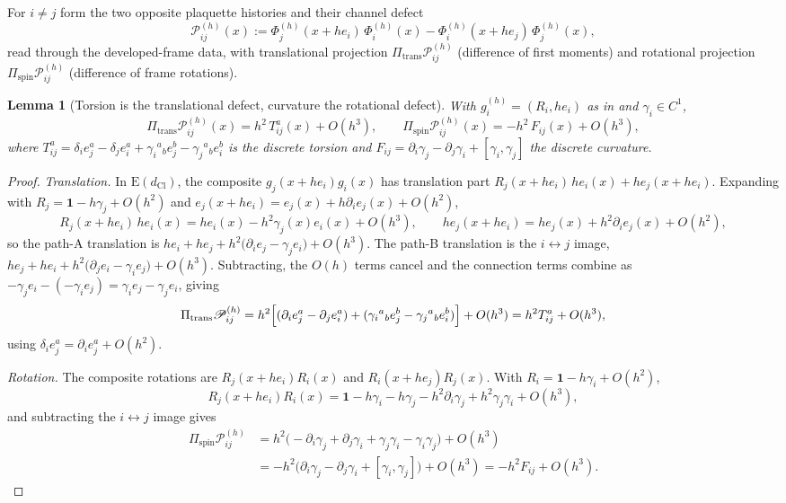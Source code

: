 \documentclass[11pt]{article}
\newtheorem{lemma}[theorem]{Lemma}
\theoremstyle{definition}
\theoremstyle{remark}
\newcommand{\dCl}{d_{\mathrm{Cl}}}
\newcommand{\one}{\mathbf{1}}
\newcommand{\Pitr}{\Pi_{\mathrm{trans}}}
\newcommand{\Pisp}{\Pi_{\mathrm{spin}}}
\newcommand{\Pcal}{\mathscr{P}}
\newcommand{\Fcal}{F}
\newcommand{\Eucl}{\mathrm{E}(\dCl)}
\begin{document}
For $i\neq j$ form the two opposite plaquette histories and their channel defect
\[
  \Pcal_{ij}^{(h)}(x)
  :=\Phi_j^{(h)}(x+he_i)\,\Phi_i^{(h)}(x)
   -\Phi_i^{(h)}(x+he_j)\,\Phi_j^{(h)}(x),
\]
read through the developed-frame data, with translational projection
$\Pitr\Pcal_{ij}^{(h)}$ (difference of first moments) and rotational projection
$\Pisp\Pcal_{ij}^{(h)}$ (difference of frame rotations).

\begin{lemma}[Torsion is the translational defect, curvature the rotational defect]
\label{lem:plaquette-split}
With $g_i^{(h)}=(R_i,he_i)$ as in  and
$\gamma_i\in C^1$,
\[
  \boxed{\ \Pitr\Pcal_{ij}^{(h)}(x)=h^2\,T^a_{ij}(x)+O(h^3),\qquad
  \Pisp\Pcal_{ij}^{(h)}(x)=-h^2\,\Fcal_{ij}(x)+O(h^3),\ }
\]
where $T^a_{ij}=\delta_i e^a_j-\delta_j e^a_i+\gamma_i{}^a{}_b e^b_j
-\gamma_j{}^a{}_b e^b_i$ is the discrete torsion and
$\Fcal_{ij}=\partial_i\gamma_j-\partial_j\gamma_i+[\gamma_i,\gamma_j]$ the
discrete curvature.
\end{lemma}

\begin{proof}
\emph{Translation.}  In $\Eucl$, the composite $g_j(x+he_i)g_i(x)$ has translation
part $R_j(x+he_i)\,h e_i(x)+h e_j(x+he_i)$.  Expanding with
$R_j=\one-h\gamma_j+O(h^2)$ and $e_j(x+he_i)=e_j(x)+h\partial_i e_j(x)+O(h^2)$,
\[
  R_j(x+he_i)\,h e_i(x)=h e_i(x)-h^2\gamma_j(x)e_i(x)+O(h^3),
  \qquad
  h e_j(x+he_i)=h e_j(x)+h^2\partial_i e_j(x)+O(h^2),
\]
so the path-A translation is
$h e_i+h e_j+h^2\bigl(\partial_i e_j-\gamma_j e_i\bigr)+O(h^3)$.  The path-B
translation is the $i\leftrightarrow j$ image,
$h e_j+h e_i+h^2\bigl(\partial_j e_i-\gamma_i e_j\bigr)+O(h^3)$.  Subtracting, the
$O(h)$ terms cancel and the connection terms combine as
$-\gamma_j e_i-(-\gamma_i e_j)=\gamma_i e_j-\gamma_j e_i$, giving
\[
  \Pitr\Pcal^{(h)}_{ij}
  =h^2\Bigl[(\partial_i e^a_j-\partial_j e^a_i)
   +(\gamma_i{}^a{}_b e^b_j-\gamma_j{}^a{}_b e^b_i)\Bigr]+O(h^3)
  =h^2 T^a_{ij}+O(h^3),
\]
using $\delta_i e^a_j=\partial_i e^a_j+O(h^2)$.

\emph{Rotation.}  The composite rotations are $R_j(x+he_i)R_i(x)$ and
$R_i(x+he_j)R_j(x)$.  With $R_i=\one-h\gamma_i+O(h^2)$,
\[
  R_j(x+he_i)R_i(x)
  =\one-h\gamma_i-h\gamma_j-h^2\partial_i\gamma_j+h^2\gamma_j\gamma_i+O(h^3),
\]
and subtracting the $i\leftrightarrow j$ image gives
\[
  \begin{aligned}
  \Pisp\Pcal^{(h)}_{ij}
  &=h^2\bigl(-\partial_i\gamma_j+\partial_j\gamma_i+\gamma_j\gamma_i
  -\gamma_i\gamma_j\bigr)+O(h^3)\\
  &=-h^2\bigl(\partial_i\gamma_j-\partial_j\gamma_i+[\gamma_i,\gamma_j]\bigr)+O(h^3)
  =-h^2\Fcal_{ij}+O(h^3).
  \end{aligned}
\]
\end{proof}
\end{document}
